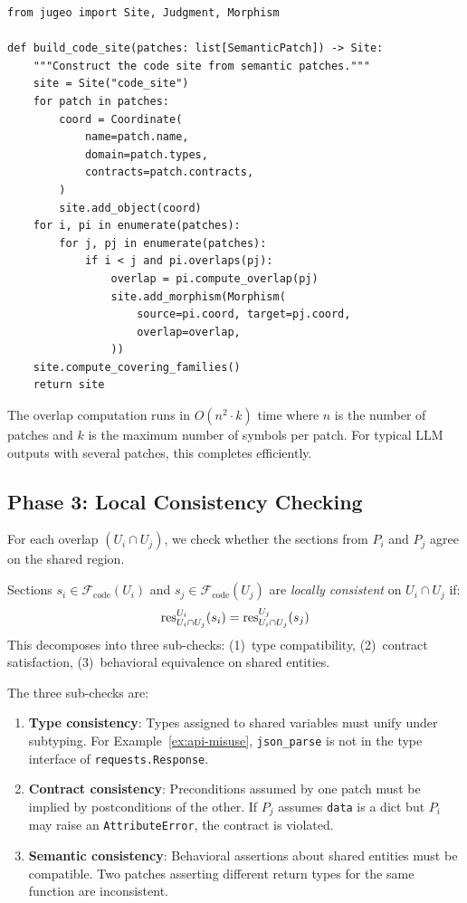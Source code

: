 \documentclass[11pt]{article}
\newcommand{\CodeSheaf}{\mathcal{F}_{\mathrm{code}}}
\begin{document}
\begin{lstlisting}
from jugeo import Site, Judgment, Morphism

def build_code_site(patches: list[SemanticPatch]) -> Site:
    """Construct the code site from semantic patches."""
    site = Site("code_site")
    for patch in patches:
        coord = Coordinate(
            name=patch.name,
            domain=patch.types,
            contracts=patch.contracts,
        )
        site.add_object(coord)
    for i, pi in enumerate(patches):
        for j, pj in enumerate(patches):
            if i < j and pi.overlaps(pj):
                overlap = pi.compute_overlap(pj)
                site.add_morphism(Morphism(
                    source=pi.coord, target=pj.coord,
                    overlap=overlap,
                ))
    site.compute_covering_families()
    return site
\end{lstlisting}

The overlap computation runs in $O(n^2 \cdot k)$ time where $n$ is
the number of patches and $k$ is the maximum number of symbols per
patch.  For typical LLM outputs with several patches,
this completes efficiently.


\subsection{Phase 3: Local Consistency Checking}

For each overlap $(U_i \cap U_j)$, we check whether the sections
from $P_i$ and $P_j$ agree on the shared region.

\begin{definition}\label{def:local-consistency}
Sections $s_i \in \CodeSheaf(U_i)$ and $s_j \in \CodeSheaf(U_j)$
are \emph{locally consistent} on $U_i \cap U_j$ if:
\[
  \mathrm{res}^{U_i}_{U_i \cap U_j}(s_i) = \mathrm{res}^{U_j}_{U_i \cap U_j}(s_j)
\]
This decomposes into three sub-checks: (1)~type compatibility,
(2)~contract satisfaction, (3)~behavioral equivalence on shared entities.
\end{definition}

The three sub-checks are:
\begin{enumerate}[noitemsep]
  \item \textbf{Type consistency}: Types assigned to shared variables
        must unify under subtyping.  For Example~\ref{ex:api-misuse},
        \texttt{json\_parse} is not in the type interface of
        \texttt{requests.Response}.
  \item \textbf{Contract consistency}: Preconditions assumed by one
        patch must be implied by postconditions of the other.  If
        $P_j$ assumes \texttt{data} is a dict but $P_i$ may raise
        an \texttt{AttributeError}, the contract is violated.
  \item \textbf{Semantic consistency}: Behavioral assertions about
        shared entities must be compatible.  Two patches asserting
        different return types for the same function are inconsistent.
\end{enumerate}
\end{document}
